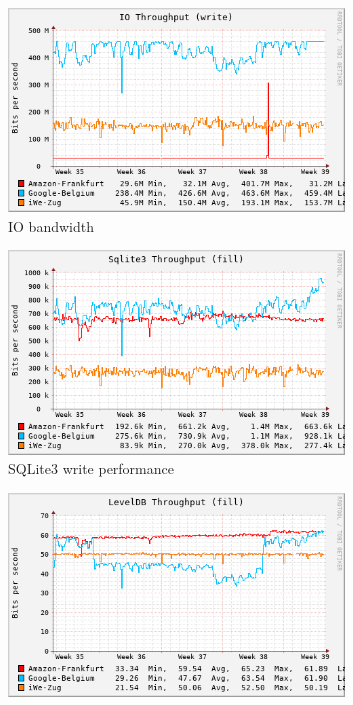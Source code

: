 \begin{figure}
\begin{subfigure}{.5\textwidth}
  \includegraphics[width=0.98\textwidth]{30d-perf/io_write-month}
  \vspace{-0.05in}
  \caption{IO bandwidth}
  \vspace{0.1in}
  \label{fig:sub6}
\end{subfigure}
\begin{subfigure}{.5\textwidth}
  \centering
  \includegraphics[width=0.98\textwidth]{30d-perf/sqlite3_fill-month}
  \vspace{-0.05in}
  \caption{SQLite3 write performance}
  \vspace{0.1in}
  \label{fig:sub7}
\end{subfigure}%
\begin{subfigure}{.5\textwidth}
  \centering
  \includegraphics[width=0.98\textwidth]{30d-perf/leveldb_fill-month}

\end{subfigure}
\end{figure}
